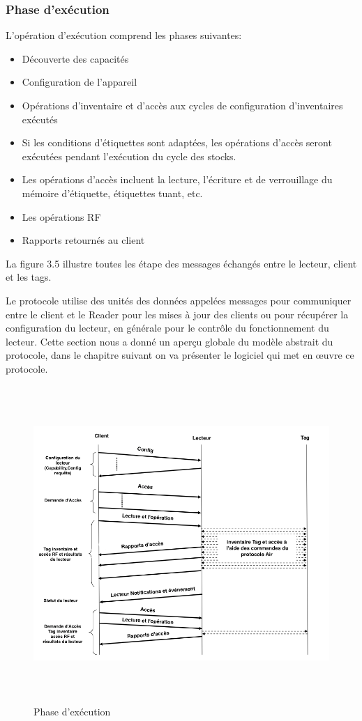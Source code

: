 \documentclass[11pt, a4paper, twoside]{book}
\begin{document}
\subsubsection{Phase d'exécution}
L'opération d'exécution comprend les phases suivantes:
\begin{itemize}
\item Découverte des capacités
\item Configuration de l'appareil
\item Opérations d'inventaire et d'accès aux cycles de configuration d'inventaires exécutés
\item Si les conditions d'étiquettes sont adaptées, les opérations d'accès seront exécutées pendant l'exécution du cycle des stocks.
\item Les opérations d'accès incluent la lecture, l'écriture et de verrouillage du mémoire d'étiquette, étiquettes tuant, etc.
\item Les opérations RF
\item Rapports retournés au client
\end{itemize}

La figure 3.5 illustre toutes les étape des messages échangés entre le lecteur, client et les tags.

Le protocole utilise des unités des données appelées messages pour communiquer entre le client et le Reader pour les mises à jour des clients ou pour récupérer la configuration du lecteur, en générale pour le contrôle du fonctionnement du lecteur. Cette section nous a donné un aperçu globale du modèle abstrait du protocole, dans le chapitre suivant on va présenter le logiciel qui met en œuvre ce protocole.
\begin{figure}[!h]
\centering
\includegraphics[height=12cm]{runtime}
\caption{Phase d'exécution}
\end{figure}
\pagebreak
\end{document}
